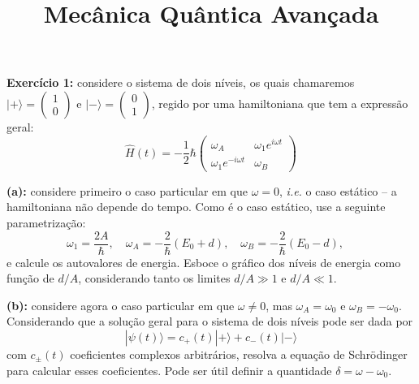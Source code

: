 \documentclass[12pt]{article}
\title{Mecânica Quântica Avançada}
\date{}
\begin{document}
\maketitle
\vspace*{-4em}

\textbf{Exercício 1:} considere o sistema de dois níveis, os quais chamaremos\\ 
$|+\rangle = \begin{pmatrix}1\\0\end{pmatrix}$ e $|-\rangle = \begin{pmatrix}0\\1\end{pmatrix}$, regido por uma hamiltoniana que tem a expressão geral:
%
\[
\hat{H}(t) = -\frac{1}{2} \hbar\left(\begin{array}{cc}\omega_{A} & \omega_{1} e^{i \omega t} \\ \omega_{1} e^{-i \omega t} & \omega_{B}\end{array}\right)
\]

\textbf{(a):} considere primeiro o caso particular em que $\omega = 0$, \textit{i.e.} o caso estático -- a hamiltoniana não depende do tempo.
Como é o caso estático, use a seguinte parametrização:
\[
\omega_1 = \frac{2A}{\hbar},\quad
\omega_A = -\frac{2}{\hbar}(E_0 + d),\quad
\omega_B = -\frac{2}{\hbar}(E_0 - d),\quad
\]
e calcule os autovalores de energia.
Esboce o gráfico dos níveis de energia como função de $d/A$, considerando tanto os limites $d/A \gg 1$ e $d/A \ll 1$.

\textbf{(b):} considere agora o caso particular em que $\omega \neq 0$, mas $\omega_A = \omega_0$ e $\omega_B = -\omega_0$.
Considerando que a solução geral para o sistema de dois níveis pode ser dada por
\[
|\psi(t)\rangle = c_+(t)|+\rangle + c_-(t)|-\rangle
\]
com $c_\pm(t)$ coeficientes complexos arbitrários,
resolva a equação de Schrödinger para calcular esses coeficientes.
Pode ser útil definir a quantidade $\delta = \omega - \omega_0$.
\end{document}
